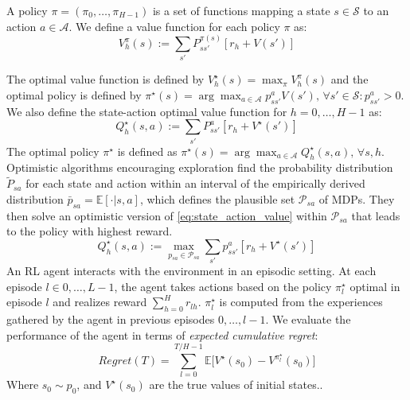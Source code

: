 \documentclass{article}
\newcommand{\E}{\mathbb{E}}
\newcommand{\opt}{^\star}
\newcommand{\states}{\mathcal{S}}
\newcommand{\actions}{\mathcal{A}}
\newcommand{\mdp}{\mathcal{M}}
\newcommand{\pset}{\mathcal{P}}
\theoremstyle{plain}
\theoremstyle{definition}
\begin{document}
A policy $\pi = (\pi_0,\ldots,\pi_{H-1})$ is a set of functions mapping a state $s\in\states$ to an action $a\in\actions$. We define a value function for each policy $\pi$ as:
\begin{equation} \label{eq:state_value}
V^\pi_h(s) := \sum_{s'} P^{\pi(s)}_{ss'} [ r_h + V(s') ]
\end{equation}

The optimal value function is defined by $V\opt_h(s) = \max_\pi V^\pi_h(s)$ and the optimal policy is defined by $\pi\opt(s) = \arg\max_{a\in\actions} p^a_{ss'}V(s') \text{, } \forall s'\in\states: p^a_{ss'}>0$. We also define the state-action optimal value function for $h=0,\ldots,H-1$ as:
\begin{equation} \label{eq:state_action_value}
Q\opt_h(s,a) := \sum_{s'}P^{a}_{ss'}[r_h + V\opt (s') ]
\end{equation}
The optimal policy $\pi\opt$ is defined as $\pi\opt(s) = \arg\max_{a\in\actions}Q\opt_h(s,a) \text{, } \forall s,h$. Optimistic algorithms encouraging exploration find the probability distribution $\tilde{P}_{sa}$ for each state and action within an interval of the empirically derived distribution $\bar{p}_{sa} = \E[\cdot|s,a]$, which defines the plausible set $\pset_{sa}$ of MDPs. They then solve an optimistic version
of \cref{eq:state_action_value} within $\pset_{sa}$ that leads to the policy with highest reward.
\begin{equation}
Q\opt_h(s,a) := \max_{p_{sa} \in \pset_{sa}} \sum_{s'}p^{a}_{ss'}[r_h + V\opt (s') ]
\end{equation}
An RL agent interacts with the environment in an episodic setting. At each episode $l\in 0,\ldots,L-1$, the agent takes actions based on the policy $\pi\opt_l$ optimal in episode $l$ and realizes reward $\sum_{h=0}^H r_{lh}$. $\pi\opt_l$ is computed from the experiences gathered by the agent in previous episodes $0,\ldots,l-1$. We evaluate the performance of the agent in terms of \emph{expected cumulative regret}:
\[
Regret(T) = \sum_{l=0}^{T/H-1} \E\bigg[ V\opt(s_0) - V^{\pi\opt_l}(s_0) \bigg]
\]
Where $s_0 \sim p_0$, and $V\opt(s_0)$ are the true values of initial states.. 
\end{document}
